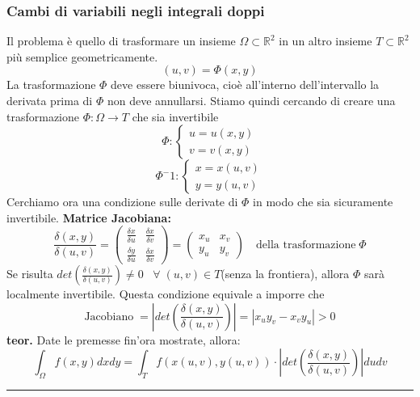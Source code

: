 \subsubsection*{Cambi di variabili negli integrali doppi}
Il problema è quello di trasformare un insieme $\Omega \subset \mathbb{R}^2$ in un altro insieme $T \subset \mathbb{R}^2$ più semplice geometricamente.
\[
    (u,v) = \Phi(x,y)   
\] 
La trasformazione $\Phi$ deve essere biunivoca, cioè all'interno dell'intervallo la derivata prima di $\Phi$ non deve annullarsi.\newline
Stiamo quindi cercando di creare una trasformazione $\Phi: \Omega \rightarrow T$ che sia invertibile
\[
    \Phi : \begin{cases}
        u = u(x,y)\\
        v = v(x,y)
    \end{cases}
\]
\[
    \Phi^-1 : \begin{cases}
        x = x(u,v)\\
        y = y(u,v)
    \end{cases}
\]
Cerchiamo ora una condizione sulle derivate di $\Phi$ in modo che sia sicuramente invertibile.\newline
\newline
\textbf{Matrice Jacobiana:}
\[
    \frac{\delta(x,y)}{\delta(u,v)} = \left(\begin{matrix}
        \frac{\delta x}{ \delta u} & \frac{\delta x}{ \delta v}\\
        \frac{\delta y}{\delta u} & \frac{\delta x}{ \delta v}
    \end{matrix}\right) = \left(\begin{matrix}
        x_u & x_v\\
        y_u & y_v
    \end{matrix}\right) \quad \text{della trasformazione}\;\Phi
\]
Se risulta $det(\frac{\delta(x,y)}{\delta(u,v)}) \neq 0 \;\; \;\forall\;(u,v) \in T$(senza la frontiera), allora $\Phi$ sarà localmente invertibile. \newline
\newline
Questa condizione equivale a imporre che
\[
    \text{Jacobiano}\; = \left|det(\frac{\delta(x,y)}{\delta(u,v)})\right| = |x_u y_v - x_v y_u| > 0
\]
\newline
\textbf{teor.} Date le premesse fin'ora mostrate, allora:
\[
    \int_\Omega f(x,y) dx dy = \int_T f(x(u,v), y(u,v)) \cdot \left|det(\frac{\delta(x,y)}{\delta(u,v)})\right| du dv
\]
\rule{\textwidth}{0,4pt}
